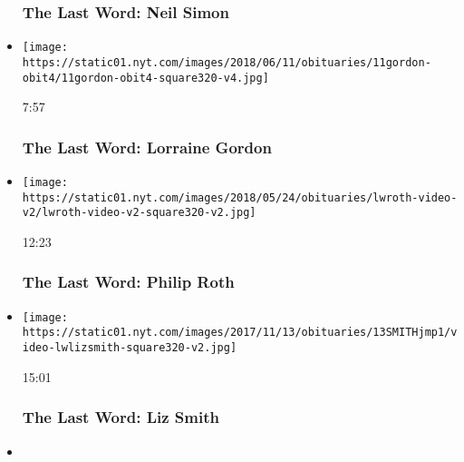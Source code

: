 \begin{itemize}
  \hypertarget{the-last-word-neil-simon}{%
  \subsubsection{The Last Word: Neil
  Simon}\label{the-last-word-neil-simon}}
\item
  \href{https://www.nytimes.com/video/obituaries/1194834005243/last-word-lorraine-gordon-obituary.html?action=click\&module=video-series-bar\&region=header\&pgtype=Article\&playlistId=video/last-word}{}

  \texttt{[image: https://static01.nyt.com/images/2018/06/11/obituaries/11gordon-obit4/11gordon-obit4-square320-v4.jpg]}

  7:57

  \hypertarget{the-last-word-lorraine-gordon}{%
  \subsubsection{The Last Word: Lorraine
  Gordon}\label{the-last-word-lorraine-gordon}}
\item
  \href{https://www.nytimes.com/video/obituaries/100000000708582/the-last-word-philip-roth.html?action=click\&module=video-series-bar\&region=header\&pgtype=Article\&playlistId=video/last-word}{}

  \texttt{[image: https://static01.nyt.com/images/2018/05/24/obituaries/lwroth-video-v2/lwroth-video-v2-square320-v2.jpg]}

  12:23

  \hypertarget{the-last-word-philip-roth}{%
  \subsubsection{The Last Word: Philip
  Roth}\label{the-last-word-philip-roth}}
\item
  \href{https://www.nytimes.com/video/obituaries/1247467924075/last-word-liz-smith-obituary.html?action=click\&module=video-series-bar\&region=header\&pgtype=Article\&playlistId=video/last-word}{}

  \texttt{[image: https://static01.nyt.com/images/2017/11/13/obituaries/13SMITHjmp1/video-lwlizsmith-square320-v2.jpg]}

  15:01

  \hypertarget{the-last-word-liz-smith}{%
  \subsubsection{The Last Word: Liz
  Smith}\label{the-last-word-liz-smith}}
\item
  \href{https://www.nytimes.com/video/business/media/100000000759949/lwhefner-hugh-obituary.html?action=click\&module=video-series-bar\&region=header\&pgtype=Article\&playlistId=video/last-word}{}


\end{itemize}
